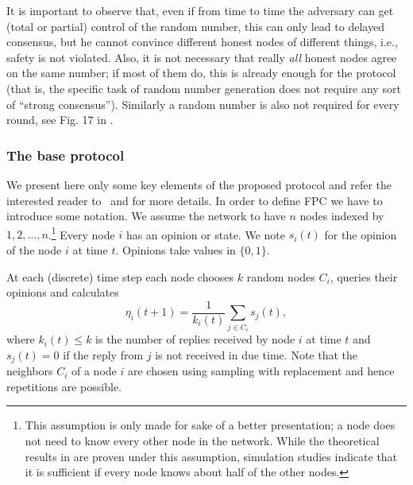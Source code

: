 \documentclass[../main.tex]{subfiles}
\begin{document}
It is important to observe that,
even if from time to time the adversary can get
(total or partial) control 
of the random number, this can only lead to delayed consensus,
but he cannot convince different honest nodes of different 
things, i.e., safety is not violated.
Also, it is not necessary that really \emph{all}
honest nodes agree on the same number; if most 
of them do, this is already enough for the 
protocol (that is, the specific task
of random number generation does not require
any sort of ``strong consensus''). Similarly a random number is also not required for every round, see Fig. 17 in \cite{FPCsim2019}.

\subsubsection{The base protocol}
We present here only some key elements of the proposed
protocol and refer the interested reader to~\cite{FPCsim2019} and \cite{popov2019} for more details. In order to define FPC we have to  introduce some notation.
We assume the network to have $n$ nodes indexed by $1,2,\ldots, n$.\footnote{This assumption is only made for sake of a better presentation; a node does not need to know every other node in the network. While the theoretical results in \cite{popov2019} are proven under this assumption, simulation studies \cite{FPCsim2019} indicate that it is sufficient if every node knows about half of the other nodes.}  Every node $i$ has an opinion or state. We note $s_{i}(t)$ for the opinion of the node $i$ at time $t$. Opinions take values in $\{0,1\}$.


At each (discrete) time step each node chooses $k$ random nodes $C_{i}$, queries their opinions and calculates 
\begin{equation*}
\eta_{i}(t+1)=\frac1{k_{i}(t)} \sum_{j\in C_{i}} s_{j}(t),
\end{equation*}
where $k_{i}(t)\leq k$ is the number of replies received by node $i$ at time $t$ and $s_j(t)=0$ if the reply from $j$ is not received in due time. 
Note that the neighbors $C_{i}$ of a node $i$ are chosen using sampling with replacement and hence repetitions are possible.
\end{document}
